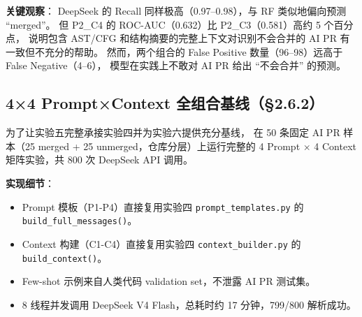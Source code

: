 \documentclass{experimentreport}
\begin{document}
\textbf{关键观察}：
DeepSeek 的 Recall 同样极高（0.97--0.98），与 RF 类似地偏向预测 ``merged''。
但 P2\_C4 的 ROC-AUC（0.632）比 P2\_C3（0.581）高约 5 个百分点，
说明包含 AST/CFG 和结构摘要的完整上下文对识别不会合并的 AI PR 有一致但不充分的帮助。
然而，两个组合的 False Positive 数量（96--98）远高于 False Negative（4--6），
模型在实践上不敢对 AI PR 给出 ``不会合并'' 的预测。

\subsection{4×4 Prompt×Context 全组合基线（§2.6.2）}

为了让实验五完整承接实验四并为实验六提供充分基线，
在 50 条固定 AI PR 样本（25 merged + 25 unmerged，仓库分层）上运行完整的
4 Prompt $\times$ 4 Context 矩阵实验，共 800 次 DeepSeek API 调用。

\textbf{实现细节}：
\begin{itemize}
    \item Prompt 模板（P1-P4）直接复用实验四 \texttt{prompt\_templates.py} 的 \texttt{build\_full\_messages()}。
    \item Context 构建（C1-C4）直接复用实验四 \texttt{context\_builder.py} 的 \texttt{build\_context()}。
    \item Few-shot 示例来自人类代码 validation set，不泄露 AI PR 测试集。
    \item 8 线程并发调用 DeepSeek V4 Flash，总耗时约 17 分钟，799/800 解析成功。
\end{itemize}
\end{document}
